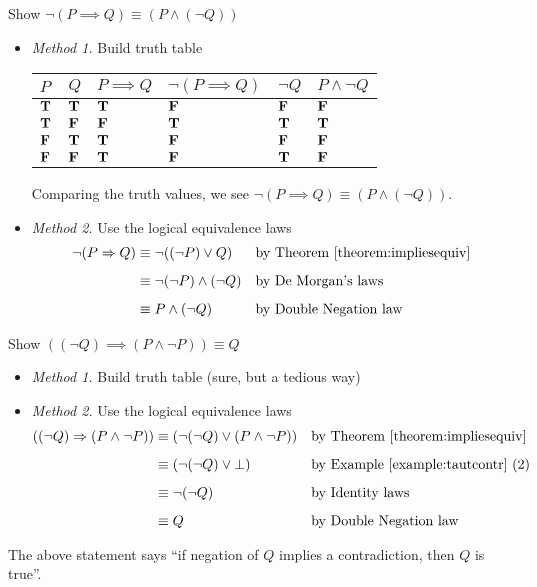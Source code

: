\begin{example}
Show $\neg(P \implies Q) \equiv (P \wedge (\neg Q))$
\begin{itemize}
\item[] \emph{Method 1.} Build truth table
\begin{center}
{\renewcommand{\arraystretch}{1.5}%
\begin{tabular}{|>{\centering}m{1cm}|>{\centering}m{1cm}|>{\centering}m{1.5cm}|>{\centering}m{2cm}|>{\centering}m{1cm}|>{\centering\arraybackslash}m{2cm}|}
\hline
\rowcolor{lightgrey}
$P$ & $Q$ & $P \implies Q$ & $\neg(P \implies Q)$ & $\neg Q$ & $P \wedge \neg Q$\\
\hline
$\true$ & $\true$ & $\true$ & $\false$ & $\false$ & $\false$\\
\hline
$\true$ & $\false$ & $\false$ & $\true$ & $\true$ & $\true$\\
\hline
$\false$ & $\true$ & $\true$ & $\false$ & $\false$ & $\false$\\
\hline
$\false$ & $\false$ & $\true$ & $\false$ & $\true$ & $\false$\\
\hline
\end{tabular}
}
\end{center}
Comparing the truth values, we see $\neg(P \implies Q) \equiv (P \wedge (\neg Q))$.
\item[] \emph{Method 2.} Use the logical equivalence laws
\begin{align*}
\neg(P \implies Q) &\equiv \neg ((\neg P) \vee Q) && \text{by Theorem \ref{theorem:impliesequiv}}\\[0.5em]
 &\equiv \neg(\neg P) \wedge (\neg Q) && \text{by De Morgan's laws}\\[0.5em]
 &\equiv P \wedge (\neg Q) && \text{by Double Negation law}
\end{align*}
\end{itemize}
\end{example}

\vspace*{1em}

\begin{example}
Show $((\neg Q) \implies (P \wedge \neg P)) \equiv Q$
\begin{itemize}
\item[] \emph{Method 1.} Build truth table (sure, but a tedious way)
\item[] \emph{Method 2.} Use the logical equivalence laws
\begin{align*}
((\neg Q) \implies (P \wedge \neg P)) &\equiv (\neg(\neg Q) \vee (P \wedge \neg P)) && \text{by Theorem \ref{theorem:impliesequiv}}\\[0.5em]
 &\equiv (\neg(\neg Q) \vee \bot) && \text{by Example \ref{example:tautcontr} (2)}\\[0.5em]
 &\equiv \neg(\neg Q) && \text{by Identity laws}\\[0.5em]
 &\equiv Q && \text{by Double Negation law}
\end{align*}
\end{itemize}
The above statement says ``if negation of $Q$ implies a contradiction, then $Q$ is true''.
\end{example}

